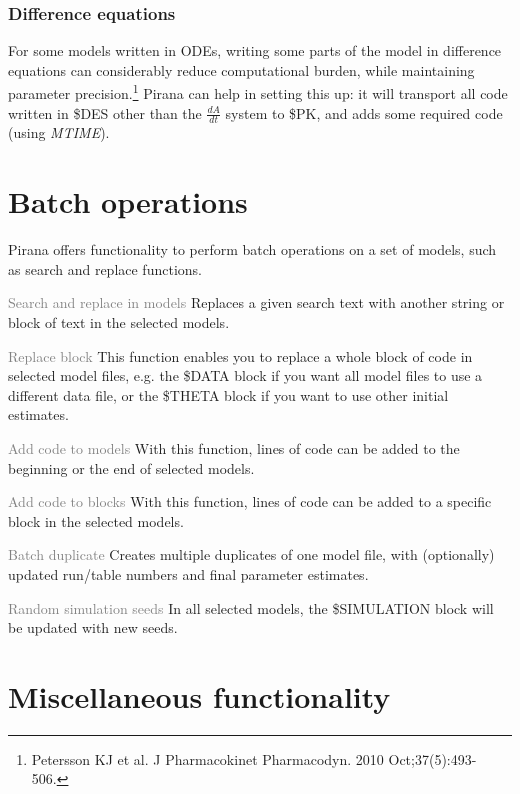 {{{{\subsubsection*{Difference equations}
For some models written in ODEs, writing some parts of the model in
difference equations can considerably reduce computational burden, while
maintaining parameter precision.\footnote{Petersson KJ et al. J
  Pharmacokinet Pharmacodyn. 2010 Oct;37(5):493-506.} Pirana can help
in setting this up: it will transport all code written in \$DES other
than the $\frac{dA}{dt}$ system to \$PK, and adds some required
code (using \textit{MTIME}).

\section{Batch operations}

Pirana offers functionality to perform batch operations on a set of
models, such as search and replace functions.

\begin{description}
	\item{\textcolor{Grey}{Search and replace in models}} Replaces
          a given search text with another string or block of text in
          the selected models.
	\item{\textcolor{Grey}{Replace block}} This function enables
          you to replace a whole block of code in selected model
          files, e.g. the \$DATA block if you want all model files to
          use a different data file, or the \$THETA block if you want
          to use other initial estimates.
	\item{\textcolor{Grey}{Add code to models}} With this
          function, lines of code can be added to the beginning or the
          end of selected models.
	\item{\textcolor{Grey}{Add code to blocks}} With this
          function, lines of code can be added to a specific block in
          the selected models.
	\item{\textcolor{Grey}{Batch duplicate}} Creates multiple
          duplicates of one model file, with (optionally) updated
          run/table numbers and final parameter estimates.
	\item{\textcolor{Grey}{Random simulation seeds}} In all
          selected models, the \$SIMULATION block will be updated with
          new seeds.
\end{description}

\section{Miscellaneous  functionality}

}}}}
